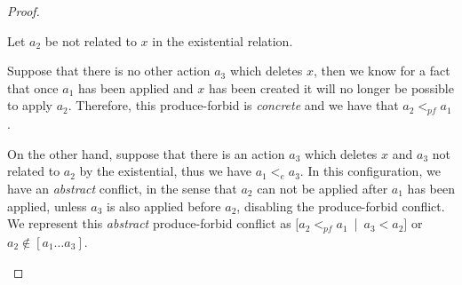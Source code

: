 \begin{proof}
\begin{description}[style=nextline,leftmargin=*]
  \item[Triggering element is not related to the action:]
    Let $a_2$ be not related to $x$ in the existential relation.

    Suppose that there is no other action $a_3$ which deletes $x$, then we know for a fact that once $a_1$ has been applied and $x$ has been created it will no longer be possible to apply $a_2$. Therefore, this produce-forbid is \emph{concrete} and we have that $a_2 <_{pf} a_1$.

    On the other hand, suppose that there is an action $a_3$ which deletes $x$ and $a_3$ not related to $a_2$ by the existential, thus we have $a_1 <_e a_3$. In this configuration, we have an \emph{abstract} conflict, in the sense that $a_2$ can not be applied after $a_1$ has been applied, unless $a_3$ is also applied before $a_2$, disabling the produce-forbid conflict. We represent this \emph{abstract} produce-forbid conflict as \mbox{$[a_2 <_{pf} a_1$ | $a_3 < a_2]$} or \mbox{$a_2 \not\in [a_1\ldots a_3]$}.
\end{description}
\end{proof}

